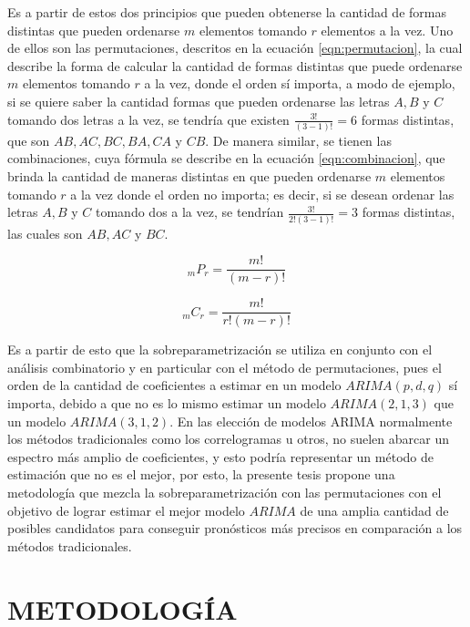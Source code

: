\documentclass[
]{article}
\begin{document}
Es a partir de estos dos principios que pueden obtenerse la cantidad de
formas distintas que pueden ordenarse \(m\) elementos tomando \(r\)
elementos a la vez. Uno de ellos son las permutaciones, descritos en la
ecuación \ref{eqn:permutacion}, la cual describe la forma de calcular la
cantidad de formas distintas que puede ordenarse \(m\) elementos tomando
\(r\) a la vez, donde el orden sí importa, a modo de ejemplo, si se
quiere saber la cantidad formas que pueden ordenarse las letras \(A, B\)
y \(C\) tomando dos letras a la vez, se tendría que existen
\(\frac{3!}{(3-1)!}=6\) formas distintas, que son \(AB, AC, BC, BA, CA\)
y \(CB\). De manera similar, se tienen las combinaciones, cuya fórmula
se describe en la ecuación \ref{eqn:combinacion}, que brinda la cantidad
de maneras distintas en que pueden ordenarse \(m\) elementos tomando
\(r\) a la vez donde el orden no importa; es decir, si se desean ordenar
las letras \(A, B\) y \(C\) tomando dos a la vez, se tendrían
\(\frac{3!}{2!(3-1)!}=3\) formas distintas, las cuales son \(AB, AC\) y
\(BC\).

\begin{equation}
\label{eqn:permutacion}
_mP_r=\frac{m!}{(m-r)!}
\end{equation}

\begin{equation}
\label{eqn:combinacion}
_mC_r=\frac{m!}{r!(m-r)!}
\end{equation}

Es a partir de esto que la sobreparametrización se utiliza en conjunto
con el análisis combinatorio y en particular con el método de
permutaciones, pues el orden de la cantidad de coeficientes a estimar en
un modelo \(ARIMA(p,d,q)\) sí importa, debido a que no es lo mismo
estimar un modelo \(ARIMA(2,1,3)\) que un modelo \(ARIMA(3,1,2)\). En
las elección de modelos ARIMA normalmente los métodos tradicionales como
los correlogramas u otros, no suelen abarcar un espectro más amplio de
coeficientes, y esto podría representar un método de estimación que no
es el mejor, por esto, la presente tesis propone una metodología que
mezcla la sobreparametrización con las permutaciones con el objetivo de
lograr estimar el mejor modelo \(ARIMA\) de una amplia cantidad de
posibles candidatos para conseguir pronósticos más precisos en
comparación a los métodos tradicionales.

\newpage

\section{METODOLOGÍA}
\end{document}

